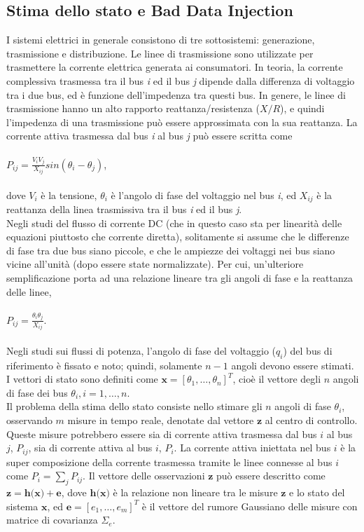 \subsection{Stima dello stato e Bad Data Injection}
I sistemi elettrici in generale consistono di tre sottosistemi: generazione, trasmissione e distribuzione. Le linee di trasmissione sono utilizzate per trasmettere la corrente elettrica generata ai consumatori. In teoria, la corrente complessiva trasmessa tra il bus \emph{i} ed il bus \emph{j} dipende dalla differenza di voltaggio tra i due bus, ed è funzione dell'impedenza tra questi bus. In genere, le linee di trasmissione hanno un alto rapporto reattanza/resistenza ($X/R$), e quindi l'impedenza di una trasmissione può essere approssimata con la sua reattanza. La corrente attiva trasmessa dal bus \emph{i} al bus \emph{j} può essere scritta come 
\\
\\
\indent$P_{ij} = \frac{V_{i}V_{j}}{X_{ij}}sin(\theta_{i} - \theta_{j})$,
\\
\\
dove $V_{i}$ è la tensione, $\theta_{i}$ è l'angolo di fase del voltaggio nel bus \emph{i}, ed $X_{ij}$ è la reattanza della linea trasmissiva tra il bus \emph{i} ed il bus \emph{j}.\\
Negli studi del flusso di corrente DC (che in questo caso sta per linearità delle equazioni piuttosto che corrente diretta), solitamente si assume che le differenze di fase tra due bus siano piccole, e che le ampiezze dei voltaggi nei bus siano vicine all'unità (dopo essere state normalizzate). Per cui, un'ulteriore semplificazione porta ad una relazione lineare tra gli angoli di fase e la reattanza delle linee,
\\
\\
\indent$P_{ij} = \frac{\theta_{i}\theta_{j}}{X_{ij}}$.
\\
\\
Negli studi sui flussi di potenza, l'angolo di fase del voltaggio ($q_i$) del bus di riferimento è fissato e noto; quindi, solamente $n - 1$ angoli devono essere stimati. I vettori di stato sono definiti come $\textbf{x} = [\theta_1, \ldots, \theta_n]^T$, cioè il vettore degli $n$ angoli di fase dei bus $\theta_i, i = 1, \ldots, n$.\\
Il problema della stima dello stato consiste nello stimare gli $n$ angoli di fase $\theta_i$, osservando $m$ misure in tempo reale, denotate dal vettore $\textbf{z}$ al centro di controllo. Queste misure potrebbero essere sia di corrente attiva trasmessa dal bus $i$ al bus $j$, $P_{ij}$, sia di corrente attiva al bus $i$, $P_i$. La corrente attiva iniettata nel bus $i$ è la super composizione della corrente trasmessa tramite le linee connesse al bus $i$ come $P_i = \sum_j{P_{ij}}$. Il vettore delle osservazioni $\textbf{z}$ può essere descritto come $\textbf{z} = \textbf{h(x)} + \textbf{e}$, dove $\textbf{h(x)}$ è la relazione non lineare tra le misure $\textbf{z}$ e lo stato del sistema $\textbf{x}$, ed $\textbf{e} = [e_1, \ldots, e_m]^T$ è il vettore del rumore Gaussiano delle misure con matrice di covarianza $\Sigma_e$.\\
